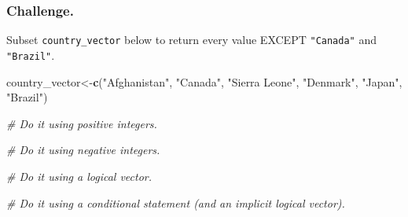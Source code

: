 \documentclass[
]{book}
\newenvironment{Shaded}{\begin{snugshade}}{\end{snugshade}}
\newcommand{\CommentTok}[1]{\textcolor[rgb]{0.56,0.35,0.01}{\textit{#1}}}
\newcommand{\DecValTok}[1]{\textcolor[rgb]{0.00,0.00,0.81}{#1}}
\newcommand{\FloatTok}[1]{\textcolor[rgb]{0.00,0.00,0.81}{#1}}
\newcommand{\KeywordTok}[1]{\textcolor[rgb]{0.13,0.29,0.53}{\textbf{#1}}}
\newcommand{\NormalTok}[1]{#1}
\newcommand{\OperatorTok}[1]{\textcolor[rgb]{0.81,0.36,0.00}{\textbf{#1}}}
\newcommand{\StringTok}[1]{\textcolor[rgb]{0.31,0.60,0.02}{#1}}
\begin{document}
\begin{Shaded}
\end{Shaded}

\hypertarget{challenge.}{%
\subsubsection*{Challenge.}\label{challenge.}}

Subset \texttt{country\_vector} below to return every value EXCEPT \texttt{"Canada"} and \texttt{"Brazil"}.

\begin{Shaded}
\begin{Highlighting}[]
\NormalTok{country_vector<-}\KeywordTok{c}\NormalTok{(}\StringTok{"Afghanistan"}\NormalTok{, }\StringTok{"Canada"}\NormalTok{, }\StringTok{"Sierra Leone"}\NormalTok{, }\StringTok{"Denmark"}\NormalTok{, }\StringTok{"Japan"}\NormalTok{, }\StringTok{"Brazil"}\NormalTok{)}

\CommentTok{# Do it using positive integers.}

\CommentTok{# Do it using negative integers.}

\CommentTok{# Do it using a logical vector.}

\CommentTok{# Do it using a conditional statement (and an implicit logical vector).}
\end{Highlighting}
\end{Shaded}
\end{document}
